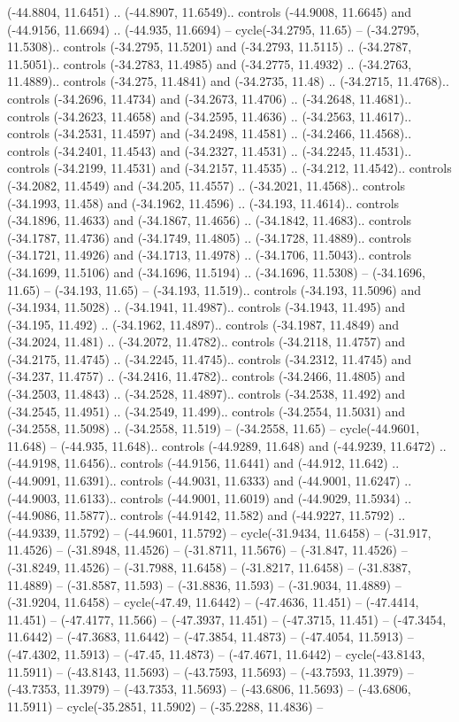 \begin{scope}[shift={(2.5552, 9.9912)}]
\begin{scope}[shift={(48.1654, -14.8546)}]
(-44.8804, 11.6451) .. (-44.8907, 11.6549).. controls (-44.9008, 11.6645) and (-44.9156, 11.6694) .. (-44.935, 11.6694) -- cycle(-34.2795, 11.65) -- (-34.2795, 11.5308).. controls (-34.2795, 11.5201) and (-34.2793, 11.5115) .. (-34.2787, 11.5051).. controls (-34.2783, 11.4985) and (-34.2775, 11.4932) .. (-34.2763, 11.4889).. controls (-34.275, 11.4841) and (-34.2735, 11.48) .. (-34.2715, 11.4768).. controls (-34.2696, 11.4734) and (-34.2673, 11.4706) .. (-34.2648, 11.4681).. controls (-34.2623, 11.4658) and (-34.2595, 11.4636) .. (-34.2563, 11.4617).. controls (-34.2531, 11.4597) and (-34.2498, 11.4581) .. (-34.2466, 11.4568).. controls (-34.2401, 11.4543) and (-34.2327, 11.4531) .. (-34.2245, 11.4531).. controls (-34.2199, 11.4531) and (-34.2157, 11.4535) .. (-34.212, 11.4542).. controls (-34.2082, 11.4549) and (-34.205, 11.4557) .. (-34.2021, 11.4568).. controls (-34.1993, 11.458) and (-34.1962, 11.4596) .. (-34.193, 11.4614).. controls (-34.1896, 11.4633) and (-34.1867, 11.4656) .. (-34.1842, 11.4683).. controls (-34.1787, 11.4736) and (-34.1749, 11.4805) .. (-34.1728, 11.4889).. controls (-34.1721, 11.4926) and (-34.1713, 11.4978) .. (-34.1706, 11.5043).. controls (-34.1699, 11.5106) and (-34.1696, 11.5194) .. (-34.1696, 11.5308) -- (-34.1696, 11.65) -- (-34.193, 11.65) -- (-34.193, 11.519).. controls (-34.193, 11.5096) and (-34.1934, 11.5028) .. (-34.1941, 11.4987).. controls (-34.1943, 11.495) and (-34.195, 11.492) .. (-34.1962, 11.4897).. controls (-34.1987, 11.4849) and (-34.2024, 11.481) .. (-34.2072, 11.4782).. controls (-34.2118, 11.4757) and (-34.2175, 11.4745) .. (-34.2245, 11.4745).. controls (-34.2312, 11.4745) and (-34.237, 11.4757) .. (-34.2416, 11.4782).. controls (-34.2466, 11.4805) and (-34.2503, 11.4843) .. (-34.2528, 11.4897).. controls (-34.2538, 11.492) and (-34.2545, 11.4951) .. (-34.2549, 11.499).. controls (-34.2554, 11.5031) and (-34.2558, 11.5098) .. (-34.2558, 11.519) -- (-34.2558, 11.65) -- cycle(-44.9601, 11.648) -- (-44.935, 11.648).. controls (-44.9289, 11.648) and (-44.9239, 11.6472) .. (-44.9198, 11.6456).. controls (-44.9156, 11.6441) and (-44.912, 11.642) .. (-44.9091, 11.6391).. controls (-44.9031, 11.6333) and (-44.9001, 11.6247) .. (-44.9003, 11.6133).. controls (-44.9001, 11.6019) and (-44.9029, 11.5934) .. (-44.9086, 11.5877).. controls (-44.9142, 11.582) and (-44.9227, 11.5792) .. (-44.9339, 11.5792) -- (-44.9601, 11.5792) -- cycle(-31.9434, 11.6458) -- (-31.917, 11.4526) -- (-31.8948, 11.4526) -- (-31.8711, 11.5676) -- (-31.847, 11.4526) -- (-31.8249, 11.4526) -- (-31.7988, 11.6458) -- (-31.8217, 11.6458) -- (-31.8387, 11.4889) -- (-31.8587, 11.593) -- (-31.8836, 11.593) -- (-31.9034, 11.4889) -- (-31.9204, 11.6458) -- cycle(-47.49, 11.6442) -- (-47.4636, 11.451) -- (-47.4414, 11.451) -- (-47.4177, 11.566) -- (-47.3937, 11.451) -- (-47.3715, 11.451) -- (-47.3454, 11.6442) -- (-47.3683, 11.6442) -- (-47.3854, 11.4873) -- (-47.4054, 11.5913) -- (-47.4302, 11.5913) -- (-47.45, 11.4873) -- (-47.4671, 11.6442) -- cycle(-43.8143, 11.5911) -- (-43.8143, 11.5693) -- (-43.7593, 11.5693) -- (-43.7593, 11.3979) -- (-43.7353, 11.3979) -- (-43.7353, 11.5693) -- (-43.6806, 11.5693) -- (-43.6806, 11.5911) -- cycle(-35.2851, 11.5902) -- (-35.2288, 11.4836) -- 
\end{scope}
\end{scope}
